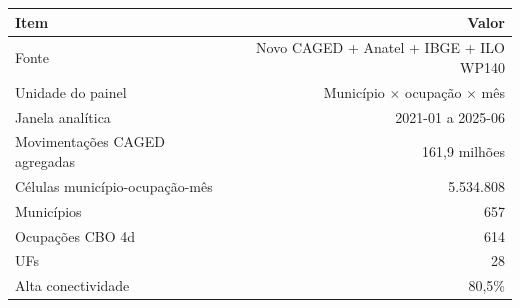 \scriptsize
\begin{tabular}{lr}
\toprule
Item & Valor \\
\midrule
Fonte & Novo CAGED + Anatel + IBGE + ILO WP140 \\
Unidade do painel & Município × ocupação × mês \\
Janela analítica & 2021-01 a 2025-06 \\
Movimentações CAGED agregadas & 161,9 milhões \\
Células município-ocupação-mês & 5.534.808 \\
Municípios & 657 \\
Ocupações CBO 4d & 614 \\
UFs & 28 \\
Alta conectividade & 80,5\% \\
\bottomrule
\end{tabular}
